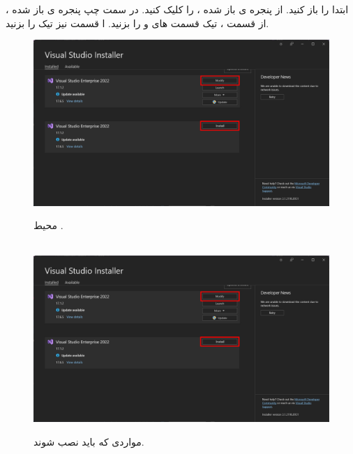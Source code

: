 {  \large
ابتدا  را باز کنید. از پنجره ی باز شده ،  را کلیک کنید. در سمت چپ پنجره ی باز شده ، از قسمت  ، تیک قسمت های  و  را بزنید.
ا قسمت  نیز تیک  را بزنید.
}
    \begin{figure}[H]
        \centering
        \includegraphics[width=\textwidth]{Images/1.Intro.2.1.png}
        \caption{محیط .} \\[25pt]
        \includegraphics[width=\textwidth]{Images/1.Intro.2.1.png}
        \caption{مواردی که باید نصب شوند.}
    \end{figure}

